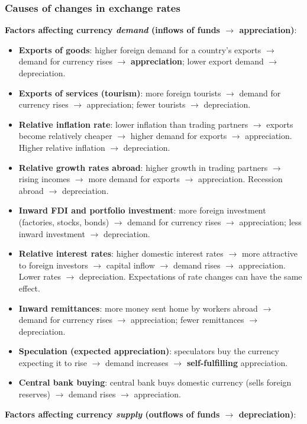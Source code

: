 \subsubsection*{Causes of changes in exchange rates}
\textbf{Factors affecting currency \textit{demand} (inflows of funds $\to$ appreciation)}:
\begin{itemize}
  \item \textbf{Exports of goods}: higher foreign demand for a country's exports $\to$ demand for currency rises $\to$ \textbf{appreciation}; lower export demand $\to$ depreciation.
  \item \textbf{Exports of services (tourism)}: more foreign tourists $\to$ demand for currency rises $\to$ appreciation; fewer tourists $\to$ depreciation.
  \item \textbf{Relative inflation rate}: lower inflation than trading partners $\to$ exports become relatively cheaper $\to$ higher demand for exports $\to$ appreciation. Higher relative inflation $\to$ depreciation.
  \item \textbf{Relative growth rates abroad}: higher growth in trading partners $\to$ rising incomes $\to$ more demand for exports $\to$ appreciation. Recession abroad $\to$ depreciation.
  \item \textbf{Inward FDI and portfolio investment}: more foreign investment (factories, stocks, bonds) $\to$ demand for currency rises $\to$ appreciation; less inward investment $\to$ depreciation.
  \item \textbf{Relative interest rates}: higher domestic interest rates $\to$ more attractive to foreign investors $\to$ capital inflow $\to$ demand rises $\to$ appreciation. Lower rates $\to$ depreciation. Expectations of rate changes can have the same effect.
  \item \textbf{Inward remittances}: more money sent home by workers abroad $\to$ demand for currency rises $\to$ appreciation; fewer remittances $\to$ depreciation.
  \item \textbf{Speculation (expected appreciation)}: speculators buy the currency expecting it to rise $\to$ demand increases $\to$ \textbf{self-fulfilling} appreciation.
  \item \textbf{Central bank buying}: central bank buys domestic currency (sells foreign reserves) $\to$ demand rises $\to$ appreciation.
\end{itemize}
\textbf{Factors affecting currency \textit{supply} (outflows of funds $\to$ depreciation)}:

